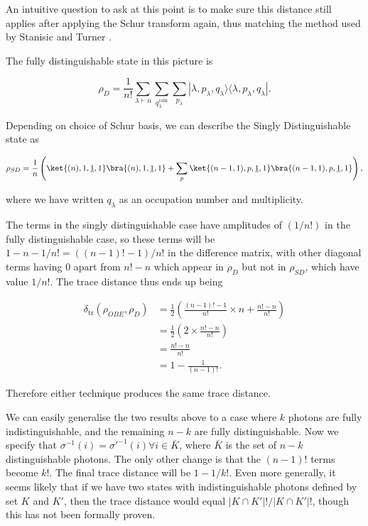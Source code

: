 An intuitive question to ask at this point is to make sure this distance still applies after applying the Schur transform again, thus matching the method used by Stanisic and Turner \cite{stanisic2018}.

The fully distinguishable state in this picture is

\begin{equation}
\rho_D = \frac{1}{n!} \sum_{\lambda \vdash n} \sum_{q_\lambda^\mathrm{coin}} \sum_{p_\lambda} |\lambda,p_\lambda,q_\lambda\rangle\langle \lambda,p_\lambda,q_\lambda|.
\end{equation}

Depending on choice of Schur basis, we can describe the Singly Distinguishable state as

\begin{equation}
\rho_{SD} = \frac{1}{n}\left(\ket{(n),1,\underline{1},1}\bra{(n),1,\underline{1},1} + \sum_{p}\ket{(n-1,1),p,\underline{1},1}\bra{(n-1,1),p,\underline{1},1}\right),
\end{equation}

\noindent where we have written $q_\lambda$ as an occupation number and multiplicity.

The terms in the singly distinguishable case have amplitudes of $(1/n!)$ in the fully distinguishable case, so these terms will be $1-n - 1/n! = ((n-1)!-1)/n!$ in the difference matrix, with other diagonal terms having $0$ apart from $n!-n$ which appear in $\rho_D$ but not in $\rho_{SD}$, which have value $1/n!$. The trace distance thus ends up being

\begin{align}
\delta_{\mathrm{tr}}(\rho_{OBE},\rho_{D}) &= \frac{1}{2}\left(\frac{(n-1)!-1}{n!}\times n + \frac{n!-n}{n!}\right)\\
&= \frac{1}{2}\left(2\times\frac{n!-n}{n!}\right)\\
&= \frac{n!-n}{n!}\\
&= 1 - \frac{1}{(n-1)!}.
\end{align}

Therefore either technique produces the same trace distance.

We can easily generalise the two results above to a case where $k$ photons are fully indistinguishable, and the remaining $n-k$ are fully distinguishable. Now we specify that $\sigma^{-1}(i)=\sigma'^{-1}(i)\forall i \in \bar{K}$, where $\bar{K}$ is the set of $n-k$ distinguishable photons. The only other change is that the $(n-1)!$ terms become $k!$. The final trace distance will be $1-1/k!$. Even more generally, it seems likely that if we have two states with indistinguishable photons defined by set $K$ and $K'$, then the trace distance would equal $|K\cap K'|!/|K\cap K'|!$, though this has not been formally proven.

